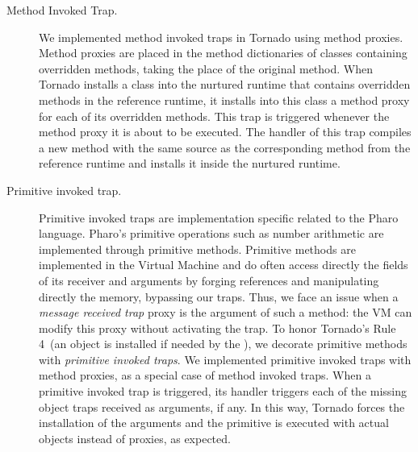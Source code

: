 \begin{description}
\item[Method Invoked Trap.] We implemented method invoked traps in Tornado using method proxies. Method proxies are placed in the method dictionaries of classes containing overridden methods, taking the place of the original method.  When Tornado installs a class into the nurtured runtime that contains overridden methods in the reference runtime, it installs into this class a method proxy for each of its overridden methods. This trap is triggered whenever the method proxy it is about to be executed. The handler of this trap compiles a new method with the same source as the corresponding method from the reference runtime and installs it inside the nurtured runtime.

\item[Primitive invoked trap.] Primitive invoked traps are implementation specific related to the Pharo language. Pharo's primitive operations such as number arithmetic are implemented through primitive methods. Primitive methods are implemented in the Virtual Machine and do often access directly the fields of its receiver and arguments by forging references and manipulating directly the memory, bypassing our traps. Thus, we face an issue when a \emph{message received trap} proxy is the argument of such a method: the VM can modify this proxy without activating the trap. To honor Tornado's Rule 4~(an object is installed if needed by the \VM), we decorate primitive methods with \emph{primitive invoked traps}. We implemented primitive invoked traps with method proxies, as a special case of method invoked traps. When a primitive invoked trap is triggered, its handler triggers each of the missing object traps received as arguments, if any. In this way, Tornado forces the installation of the arguments and the primitive is executed with actual objects instead of proxies, as expected.

\end{description}


